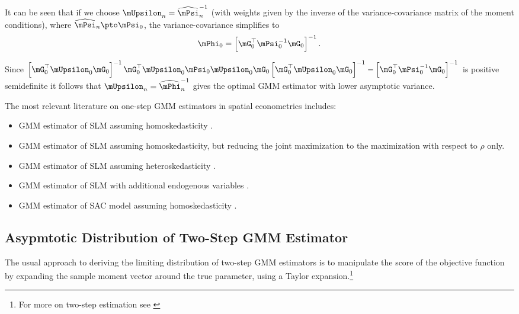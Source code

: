 \documentclass[english,12pt]{book}\usepackage[]{graphicx}\usepackage[]{xcolor}
\begin{document}
It can be seen that if we choose $\mUpsilon_n = \widehat{\mPsi}^{-1}_n$ (with weights given by the inverse of the variance-covariance matrix of the moment conditions), where $\widehat{\mPsi}_n\pto \mPsi_0$, the variance-covariance simplifies to
\begin{equation*}
\mPhi_0 = \left[\mG^\top_0\mPsi^{-1}_0\mG_0\right]^{-1}.
\end{equation*}

Since $\left[\mG^\top_0\mUpsilon_0\mG_0\right]^{-1}\mG^\top_0\mUpsilon_0\mPsi_0\mUpsilon_0\mG_0\left[\mG^\top_0\mUpsilon_0\mG_0\right]^{-1} - \left[\mG^\top_0\mPsi^{-1}_0\mG_0\right]^{-1}$ is positive semidefinite it follows that $\mUpsilon_n= \widehat{\mPhi}^{-1}_n$ gives the optimal GMM estimator with lower asymptotic variance. 

The most relevant literature on one-step GMM estimators in spatial econometrics includes:
\begin{itemize}
  \item GMM estimator of SLM assuming homoskedasticity \citep{lee2007gmm}.
  \item GMM estimator of SLM assuming homoskedasticity, but reducing the joint maximization to the maximization with respect to $\rho$ only. 
  \item GMM estimator of SLM assuming heteroskedasticity \citep{lin2010gmm}. 
  \item GMM estimator of SLM with additional endogenous variables \citep{liu2015gmm}.
  \item GMM estimator of SAC model assuming homoskedasticity \citep{lee2010efficient, liu2010efficient}.
\end{itemize}

\subsection{Asypmtotic Distribution of Two-Step GMM Estimator}\label{section:2step-gmm}

The usual approach to deriving the limiting distribution of two-step GMM estimators is to manipulate the score of the objective function by expanding the sample moment vector around the true parameter, using a Taylor expansion.\footnote{For more on two-step estimation see \citet[][section 6]{newey1994large}}
\end{document}
